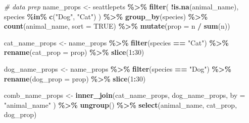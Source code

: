 \documentclass[
]{article}
\newenvironment{Shaded}{\begin{snugshade}}{\end{snugshade}}
\newcommand{\AttributeTok}[1]{\textcolor[rgb]{0.13,0.29,0.53}{#1}}
\newcommand{\CommentTok}[1]{\textcolor[rgb]{0.56,0.35,0.01}{\textit{#1}}}
\newcommand{\ConstantTok}[1]{\textcolor[rgb]{0.56,0.35,0.01}{#1}}
\newcommand{\DecValTok}[1]{\textcolor[rgb]{0.00,0.00,0.81}{#1}}
\newcommand{\FunctionTok}[1]{\textcolor[rgb]{0.13,0.29,0.53}{\textbf{#1}}}
\newcommand{\NormalTok}[1]{#1}
\newcommand{\OtherTok}[1]{\textcolor[rgb]{0.56,0.35,0.01}{#1}}
\newcommand{\SpecialCharTok}[1]{\textcolor[rgb]{0.81,0.36,0.00}{\textbf{#1}}}
\newcommand{\StringTok}[1]{\textcolor[rgb]{0.31,0.60,0.02}{#1}}
\begin{document}
\begin{Shaded}
\begin{Highlighting}[]
\CommentTok{\# data prep}
\NormalTok{name\_props }\OtherTok{\textless{}{-}}\NormalTok{ seattlepets }\SpecialCharTok{\%\textgreater{}\%}
  \FunctionTok{filter}\NormalTok{(}
    \SpecialCharTok{!}\FunctionTok{is.na}\NormalTok{(animal\_name),}
\NormalTok{    species }\SpecialCharTok{\%in\%} \FunctionTok{c}\NormalTok{(}\StringTok{"Dog"}\NormalTok{, }\StringTok{"Cat"}\NormalTok{)}
\NormalTok{  ) }\SpecialCharTok{\%\textgreater{}\%}
  \FunctionTok{group\_by}\NormalTok{(species) }\SpecialCharTok{\%\textgreater{}\%}
  \FunctionTok{count}\NormalTok{(animal\_name, }\AttributeTok{sort =} \ConstantTok{TRUE}\NormalTok{) }\SpecialCharTok{\%\textgreater{}\%}
  \FunctionTok{mutate}\NormalTok{(}\AttributeTok{prop =}\NormalTok{ n }\SpecialCharTok{/} \FunctionTok{sum}\NormalTok{(n))}

\NormalTok{cat\_name\_props }\OtherTok{\textless{}{-}}\NormalTok{ name\_props }\SpecialCharTok{\%\textgreater{}\%}
  \FunctionTok{filter}\NormalTok{(species }\SpecialCharTok{==} \StringTok{"Cat"}\NormalTok{) }\SpecialCharTok{\%\textgreater{}\%}
  \FunctionTok{rename}\NormalTok{(}\AttributeTok{cat\_prop =}\NormalTok{ prop) }\SpecialCharTok{\%\textgreater{}\%}
  \FunctionTok{slice}\NormalTok{(}\DecValTok{1}\SpecialCharTok{:}\DecValTok{30}\NormalTok{)}

\NormalTok{dog\_name\_props }\OtherTok{\textless{}{-}}\NormalTok{ name\_props }\SpecialCharTok{\%\textgreater{}\%}
  \FunctionTok{filter}\NormalTok{(species }\SpecialCharTok{==} \StringTok{"Dog"}\NormalTok{) }\SpecialCharTok{\%\textgreater{}\%}
  \FunctionTok{rename}\NormalTok{(}\AttributeTok{dog\_prop =}\NormalTok{ prop) }\SpecialCharTok{\%\textgreater{}\%}
  \FunctionTok{slice}\NormalTok{(}\DecValTok{1}\SpecialCharTok{:}\DecValTok{30}\NormalTok{)}

\NormalTok{comb\_name\_props }\OtherTok{\textless{}{-}} \FunctionTok{inner\_join}\NormalTok{(cat\_name\_props, dog\_name\_props,}
  \AttributeTok{by =} \StringTok{"animal\_name"}
\NormalTok{) }\SpecialCharTok{\%\textgreater{}\%}
  \FunctionTok{ungroup}\NormalTok{() }\SpecialCharTok{\%\textgreater{}\%}
  \FunctionTok{select}\NormalTok{(animal\_name, cat\_prop, dog\_prop)}


\end{Highlighting}
\end{Shaded}
\end{document}
